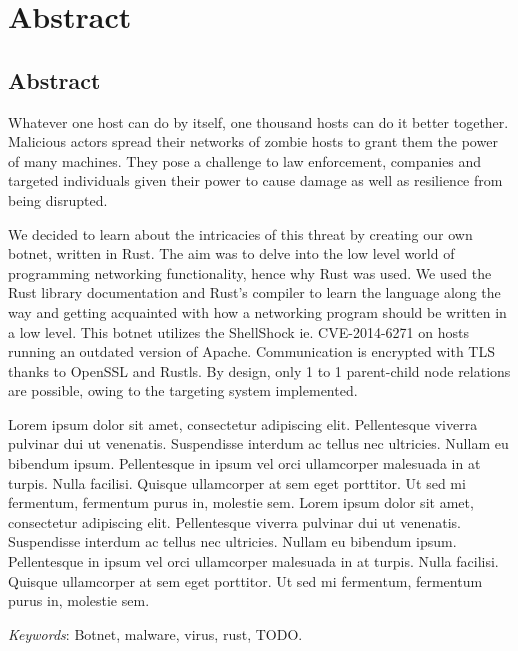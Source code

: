 \documentclass[../main.tex]{subfiles}
\begin{document}
    \newpage

	\chapter*{Abstract}

    \section*{Abstract}

Whatever one host can do by itself, one thousand hosts can do it better together. Malicious actors spread their networks of zombie hosts to grant them the power of many machines.
They pose a challenge to law enforcement, companies and targeted individuals given their power to cause damage as well as resilience from being disrupted.

We decided to learn about the intricacies of this threat by creating our own botnet, written in Rust.
The aim was to delve into the low level world of programming networking functionality, hence why Rust was used. We used the Rust library documentation and Rust's compiler to learn
the language along the way and getting acquainted with how a networking program should be written in a low level.
This botnet utilizes the ShellShock ie. CVE-2014-6271 on hosts running an outdated version of Apache.
Communication is encrypted with TLS thanks to OpenSSL and Rustls. By design, only 1 to 1 parent-child node relations are possible, owing to the targeting system implemented.




Lorem ipsum dolor sit amet, consectetur adipiscing elit. Pellentesque viverra pulvinar dui ut venenatis.
Suspendisse interdum ac tellus nec ultricies. Nullam eu bibendum ipsum. Pellentesque in ipsum vel orci 
ullamcorper malesuada in at turpis. Nulla facilisi. Quisque ullamcorper at sem eget porttitor. Ut sed mi fermentum, 
fermentum purus in, molestie sem.
Lorem ipsum dolor sit amet, consectetur adipiscing elit. Pellentesque viverra pulvinar dui ut venenatis.
Suspendisse interdum ac tellus nec ultricies. Nullam eu bibendum ipsum. Pellentesque in ipsum vel orci 
ullamcorper malesuada in at turpis. Nulla facilisi. Quisque ullamcorper at sem eget porttitor. Ut sed mi fermentum, 
fermentum purus in, molestie sem.

	\qquad \textit{Keywords}: Botnet, malware, virus, rust, TODO.


	\vspace{10pt}
\end{document}
